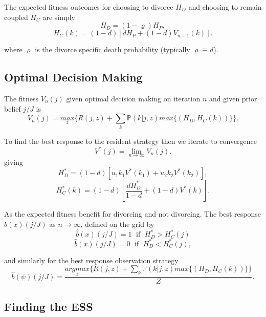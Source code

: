 \documentclass[10pt]{article}
\begin{document}
The expected fitness outcomes for choosing to divorce $H_{D}$ and
choosing to remain coupled $H_{C}$ are simply
\[
H_{D}=(1-\varrho)H_{P},
\]
\begin{equation}
	H_{C}(k)=(1-d)[dH_{P}+(1-d)V_{n-1}(k)].\label{eq:-3-1-1}
\end{equation}

where $\varrho$ is the divorce specific death probability (typically
$\varrho\equiv d$). 

\subsection{Optimal Decision Making}

The fitness $V_{n}(j)$ given optimal decision making on iteration
$n$ and given prior belief $j/J$ is
\begin{equation}
	V_{n}(j)=\underset{z}{max}\{R(j,z)+\underset{k}{\sum}\mathbb{P}(k|j,z)\underset{}{max}\{(H_{D},H_{C}(k))\}\}.\label{eq:-4-1}
\end{equation}

To find the best response to the resident strategy then we iterate
to convergence 
\begin{equation}
	V^{*}(j)=\underset{n\rightarrow\infty}{\lim}V_{n}(j).\label{eq:-3-1}
\end{equation}
giving 
\begin{equation}
	H_{D}^{*}=(1-d)[u_{1}k_{1}V^{*}(k_{1})+u_{2}k_{2}V^{*}(k_{2})],\label{eq:-4-1}
\end{equation}
\begin{equation}
	H_{C}^{*}(k)=(1-d)[\frac{dH_{D}^{*}}{1-d}+(1-d)V^{*}(k)].\label{eq:-3-1}
\end{equation}

As the expected fitness benefit for divorcing and not divorcing. The
best response $\hat{b}(x)(j/J)$ as $n\rightarrow\infty$, defined
on the grid by 
\begin{equation}
	\hat{b}(x)(j/J)=1\;\text{ if }\;H_{D}^{*}>H_{C}^{*}(j)\label{eq:-2-2}
\end{equation}
\begin{equation}
	\hat{b}(x)(j/J)=0\;\text{ if }\;H_{D}^{*}<H_{C}^{*}(j),\label{eq:-1-1}
\end{equation}

and similarly for the best response observation strategy 
\[
\hat{b}(\psi)(j/J)=\frac{\underset{z}{argmax}\{R(j,z)+\underset{k}{\sum}\mathbb{P}(k|j,z)\underset{}{max}\{(H_{D},H_{C}(k))\}\}}{Z}.
\]


\subsection{Finding the ESS}
\end{document}
